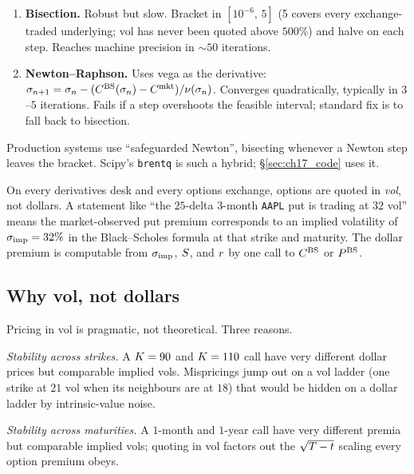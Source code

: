 \begin{enumerate}
  \item \textbf{Bisection.} Robust but slow. Bracket in
  $[10^{-6},\,5]$ (5 covers every exchange-traded underlying; vol
  has never been quoted above $500\%$) and halve on each step.
  Reaches machine precision in $\sim 50$ iterations.
  \item \textbf{Newton--Raphson.} Uses vega as the derivative:
  $\sigma_{n+1} = \sigma_n - (C^{\text{BS}}(\sigma_n) -
  C^{\text{mkt}})/\nu(\sigma_n)$. Converges quadratically,
  typically in $3$--$5$ iterations. Fails if a step overshoots
  the feasible interval; standard fix is to fall back to bisection.
\end{enumerate}

Production systems use ``safeguarded Newton'', bisecting whenever a
Newton step leaves the bracket. Scipy's \texttt{brentq} is such a
hybrid; \S\ref{sec:ch17_code} uses it.

\begin{keyfactbox}
On every derivatives desk and every options exchange, options are
quoted in \emph{vol}, not dollars. A statement like ``the $25$-delta
$3$-month \texttt{AAPL} put is trading at $32$ vol'' means the
market-observed put premium corresponds to an implied volatility of
$\sigma_{\text{imp}} = 32\%$ in the Black--Scholes formula at that
strike and maturity. The dollar premium is computable from
$\sigma_{\text{imp}}$, $S$, and $r$ by one call to
$C^{\text{BS}}$ or $P^{\text{BS}}$.
\end{keyfactbox}

\subsection{Why vol, not dollars}
\label{subsec:ch17_why_vol}

Pricing in vol is pragmatic, not theoretical. Three reasons.

\emph{Stability across strikes.} A $K = 90$ and
$K = 110$ call have very different dollar prices but
comparable implied vols. Mispricings jump out on a vol ladder
(one strike at $21$ vol when its neighbours are at $18$) that
would be hidden on a dollar ladder by intrinsic-value noise.

\emph{Stability across maturities.} A $1$-month and $1$-year call
have very different premia but comparable implied vols; quoting in
vol factors out the $\sqrt{T - t}$ scaling every option premium
obeys.


